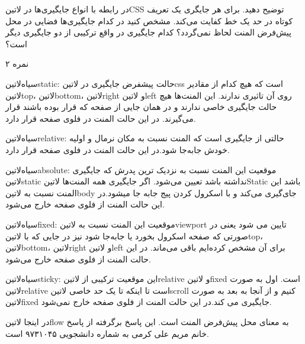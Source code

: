 \documentclass[../main.tex]{subfiles}
\begin{document}

در رابطه با انواع جایگیری‌ها در ‌لاتین{CSS} توضیح دهید. برای هر جایگری یک تعریف کوتاه در حد یک خط کفایت می‌کند. مشخص کنید در کدام
جایگیری‌ها فضایی در محل پیش‌فرض المنت لحاظ نمی‌گردد؟ کدام جایگیری در واقع ترکیبی از دو جایگیری دیگر است؟

۲ نمره

\begin{answer}


 ‌سیاه{‌لاتین{static}}:
حالت پیشفرض جایگیری در ‌لاتین{css} است که هیچ کدام از مقادیر
‌لاتین{top}، ‌لاتین{bottom}، ‌لاتین{right} و ‌لاتین{left} روی آن تاثیری ندارند.
این المنت‌ها هیچ حالت جایگیری خاصی ندارند و در همان جایی از صفحه که قرار بوده باشند قرار می‌گیرند. در این
حالت المنت در فلوی صفحه قرار دارد.

 ‌سیاه{‌لاتین{relative}}:
حالتی از جایگیری است که المنت نسبت به مکان نرمال و اولیه خودش جابه‌جا شود.در این حالت المنت در فلوی
صفحه قرار دارد.

 ‌سیاه{‌لاتین{absolute}}:
موقعیت این المنت نسبت به نزدیک ترین پدرش که جایگیری ‌لاتین{static} نداشته باشد تعیین می‌شود.
اگر جایگیری همه
المنت‌ها ‌لاتین{Static} باشد این المنت نسبت به ‌لاتین{body} جای‌گیری می‌کند
و با اسکرول کردن پیج جابه جا میشود.در این
حالت المنت از فلوی صفحه خارج می‌شود.

 ‌سیاه{‌لاتین{fixed}}:
موقعیت این المنت نسبت به ‌لاتین{viewport} تایین می شود یعنی در صورتی که صفحه اسکرول بخورد یا جابه‌جا شود نیز
در جایی که با
‌لاتین{top}،
‌لاتین{bottom}،
‌لاتین{right} و
‌لاتین{left}
برای آن مشخص کرده‌ایم باقی می‌ماند. در این حالت المنت از فلوی صفحه
خارج می‌شود.

 ‌سیاه{‌لاتین{sticky}}:
این موقعیت ترکیبی از ‌لاتین{relative} و ‌لاتین{fixed} است. اول به صورت ‌لاتین{relative} است تا اینکه تا یک حد خاصی ‌لاتین{scroll} کنیم
و از آنجا به بعد به صورت ‌لاتین{fixed} جایگیری می کند.در این حالت المنت از فلوی صفحه خارج نمی‌شود.


در اینجا ‌لاتین{flow} به معنای محل پیش‌فرض المنت است. این پاسخ برگرفته از پاسخ خانم مریم علی کرمی
به شماره دانشجویی ۹۷۳۱۰۴۵ است.

\end{answer}
\end{document}
